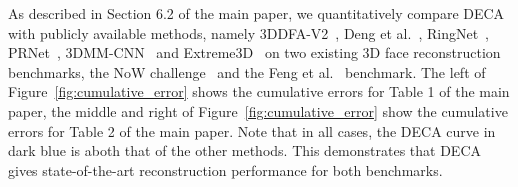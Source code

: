 \documentclass[final]{cvpr}
\newcommand{\modelname}{DECA\xspace}
\begin{document}
\begin{appendices}
As described in Section 6.2 of the main paper, we quantitatively compare \modelname with publicly available methods, namely 3DDFA-V2~\cite{guo2020towards}, Deng et al.~\cite{Deng2019}, RingNet~\cite{Sanyal2019}, PRNet~\cite{Feng2018}, 3DMM-CNN~\cite{AnhTran2017} and Extreme3D~\cite{AnhTran2018} on two existing 3D face reconstruction benchmarks, the NoW challenge~\cite{Sanyal2019} and the Feng et al.~\cite{Feng2018evaluation} benchmark.
The left of Figure~\ref{fig:cumulative_error} shows the cumulative errors for Table 1 of the main paper, the middle and right of Figure~\ref{fig:cumulative_error} show the cumulative errors for Table 2 of the main paper. 
Note that in all cases, the \modelname curve in dark blue is aboth that of the other methods.
This demonstrates that \modelname gives state-of-the-art reconstruction performance for both benchmarks.




\end{appendices}
\end{document}
